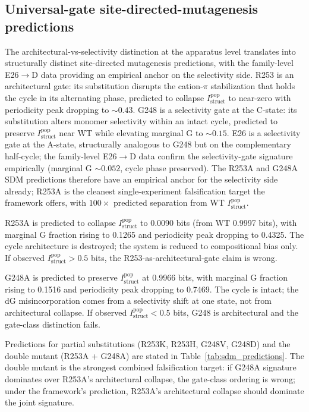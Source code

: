 \documentclass[aps,prx,reprint,amsmath,amssymb,floatfix,superscriptaddress,nofootinbib]{revtex4-2}
\theoremstyle{plain-thm}
\theoremstyle{definition-thm}
\newcommand{\Istructpop}{I_{\mathrm{struct}}^{\mathrm{pop}}}
\begin{document}
\subsection{Universal-gate site-directed-mutagenesis predictions}

The architectural-vs-selectivity distinction at the apparatus level translates into structurally distinct site-directed mutagenesis predictions, with the family-level E26$\to$D data providing an empirical anchor on the selectivity side. R253 is an architectural gate: its substitution disrupts the cation-$\pi$ stabilization that holds the cycle in its alternating phase, predicted to collapse $\Istructpop$ to near-zero with periodicity peak dropping to $\sim 0.43$. G248 is a selectivity gate at the C-state: its substitution alters monomer selectivity within an intact cycle, predicted to preserve $\Istructpop$ near WT while elevating marginal G to $\sim 0.15$. E26 is a selectivity gate at the A-state, structurally analogous to G248 but on the complementary half-cycle; the family-level E26$\to$D data confirm the selectivity-gate signature empirically (marginal G $\sim 0.052$, cycle phase preserved). The R253A and G248A SDM predictions therefore have an empirical anchor for the selectivity side already; R253A is the cleanest single-experiment falsification target the framework offers, with $100\times$ predicted separation from WT $\Istructpop$.

R253A is predicted to collapse $\Istructpop$ to 0.0090 bits (from WT 0.9997 bits), with marginal G fraction rising to 0.1265 and periodicity peak dropping to 0.4325. The cycle architecture is destroyed; the system is reduced to compositional bias only. If observed $\Istructpop > 0.5$ bits, the R253-as-architectural-gate claim is wrong.

G248A is predicted to preserve $\Istructpop$ at 0.9966 bits, with marginal G fraction rising to 0.1516 and periodicity peak dropping to 0.7469. The cycle is intact; the dG misincorporation comes from a selectivity shift at one state, not from architectural collapse. If observed $\Istructpop < 0.5$ bits, G248 is architectural and the gate-class distinction fails.

Predictions for partial substitutions (R253K, R253H, G248V, G248D) and the double mutant (R253A + G248A) are stated in Table~\ref{tab:sdm_predictions}. The double mutant is the strongest combined falsification target: if G248A signature dominates over R253A's architectural collapse, the gate-class ordering is wrong; under the framework's prediction, R253A's architectural collapse should dominate the joint signature.
\end{document}

